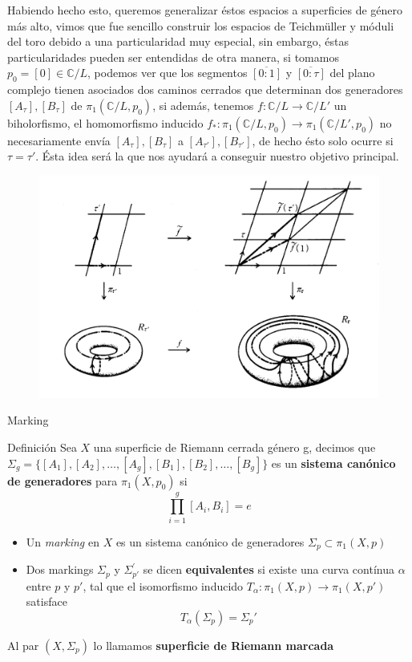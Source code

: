 \documentclass[xcolor=dvipsnames,10pt]{beamer}
\newcommand\C{\ensuremath{\mathbb{C}}}
\begin{document}
\begin{frame}
    Habiendo hecho esto, queremos generalizar éstos espacios a superficies de género más alto, vimos que fue sencillo construir los espacios de Teichmüller y móduli del toro debido a una particularidad muy especial, sin embargo, éstas particularidades pueden ser entendidas de otra manera, si tomamos $p_0 = [0] \in \C /L$, podemos ver que los segmentos $\overline{[0:1]}$ y $\overline{[0:\tau]}$ del plano complejo tienen asociados dos caminos cerrados que determinan dos generadores $[A_\tau],[B_\tau]$ de $\pi_1(\C /L,p_0)$, si además, tenemos $f: \C/L \rightarrow \C/L'$ un biholorfismo, el homomorfismo inducido $f_*: \pi_1(\C/L,p_0) \rightarrow \pi_1(\C/L', p_0)$ no necesariamente envía $[A_\tau],[B_\tau]$ a $[A_{\tau'}],[B_{\tau'}]$, de hecho ésto solo ocurre si $\tau = \tau'$. Ésta idea será la que nos ayudará a conseguir nuestro objetivo principal.
    \begin{figure}
            \centering
            \includegraphics[width=0.5\linewidth]{Imagenes/Marking.png}
        \end{figure}  
\end{frame}
\begin{frame}{Marking}
    \begin{block}{Definición}
        Sea $X$ una superficie de Riemann cerrada género g,  decimos que $\Sigma_g = \{[A_1],[A_2],\ldots,[A_g],[B_1],[B_2],\ldots, [B_g]\}$ es un \textbf{sistema canónico de generadores} para $\pi_1(X,p_0)$ si
    \[ \prod_{i=1}^g [A_i,B_i] = e \]
    \begin{itemize}
        \item Un \textit{marking} en $X$ es un sistema canónico de generadores $\Sigma_p \subset \pi_1(X,p)$
        \item Dos markings $\Sigma_p$ y $\Sigma_{p'}^\prime$ se dicen  \textbf{equivalentes} si existe una curva contínua $\alpha$ entre $p$ y $p'$, tal que el isomorfismo inducido $T_\alpha: \pi_1(X,p) \rightarrow \pi_1(X,p')$ satisface
        \[
        T_\alpha(\Sigma_p) = \Sigma_p'
        \]
    \end{itemize}
    Al par $(X,\Sigma_p)$ lo llamamos \textbf{superficie de Riemann marcada} 
    \end{block}
    \end{frame}
\end{document}
